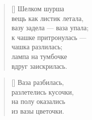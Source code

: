 \documentclass[14pt]{memoir}
\begin{document}
\begin{verse}[\versewidth]
Шелком шурша\\
вещь как листик летала,\\
вазу задела --- ваза упала;\\
к чашке притронулась ---\\
чашка разлилась;\\
лампа на тумбочке\\
вдруг заискрилась.
\end{verse}

\begin{verse}[\versewidth]
Ваза разбилась,\\
разлетелись кусочки, \\
на полу оказались \\
из вазы цветочки. \\
\end{verse}

\BgThispage
\end{document}
